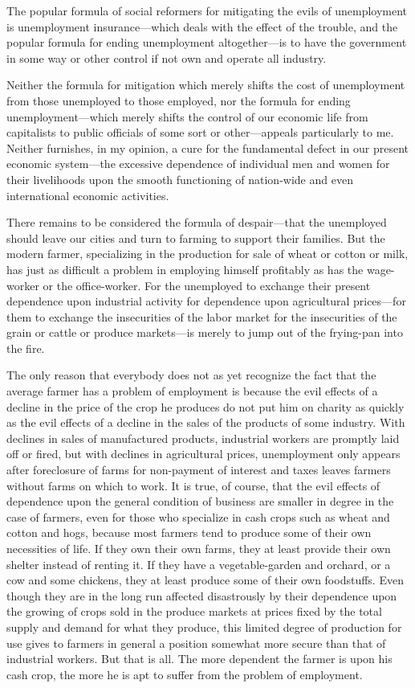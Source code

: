 \documentclass{book}
\begin{document}
The popular formula of social reformers for mitigating the evils of unemployment is unemployment insurance—which deals with the effect of the trouble, and the popular formula for ending unemployment altogether—is to have the government in some way or other control if not own and operate all industry.

Neither the formula for mitigation which merely shifts the cost of unemployment from those unemployed to those employed, nor the formula for ending unemployment—which merely shifts the control of our economic life from capitalists to public officials of some sort or other—appeals particularly to me. Neither furnishes, in my opinion, a cure for the fundamental defect in our present economic system—the excessive dependence of individual men and women for their livelihoods upon the smooth functioning of nation-wide and even international economic activities.

There remains to be considered the formula of despair—that the unemployed should leave our cities and turn to farming to support their families. But the modern farmer, specializing in the production for sale of wheat or cotton or milk, has just as difficult a problem in employing himself profitably as has the wage-worker or the office-worker. For the unemployed to exchange their present dependence upon industrial activity for dependence upon agricultural prices—for them to exchange the insecurities of the labor market for the insecurities of the grain or cattle or produce markets—is merely to jump out of the frying-pan into the fire.

The only reason that everybody does not as yet recognize the fact that the average farmer has a problem of employment is because the evil effects of a decline in the price of the crop he produces do not put him on charity as quickly as the evil effects of a decline in the sales of the products of some industry. With declines in sales of manufactured products, industrial workers are promptly laid off or fired, but with declines in agricultural prices, unemployment only appears after foreclosure of farms for non-payment of interest and taxes leaves farmers without farms on which to work. It is true, of course, that the evil effects of dependence upon the general condition of business are smaller in degree in the case of farmers, even for those who specialize in cash crops such as wheat and cotton and hogs, because most farmers tend to produce some of their own necessities of life. If they own their own farms, they at least provide their own shelter instead of renting it. If they have a vegetable-garden and orchard, or a cow and some chickens, they at least produce some of their own foodstuffs. Even though they are in the long run affected disastrously by their dependence upon the growing of crops sold in the produce markets at prices fixed by the total supply and demand for what they produce, this limited degree of production for use gives to farmers in general a position somewhat more secure than that of industrial workers. But that is all. The more dependent the farmer is upon his cash crop, the more he is apt to suffer from the problem of employment.
\end{document}
